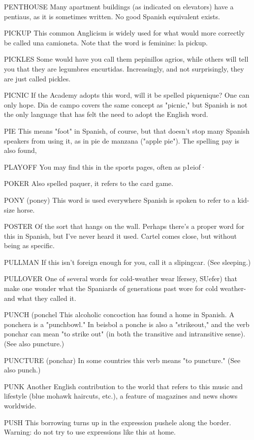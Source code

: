 PENTHOUSE Many apartment buildings (as indicated on elevators) have a pentiaus, as it is sometimes written. No good Spanish
equivalent exists.

PICKUP This common Anglicism is widely used for what
would more correctly be called una camioneta. Note that the word is
feminine: la pickup.

PICKLES Some would have you call them pepinillos agrios,
while others will tell you that they are legumbres encurtidas. Increasingly, and not surprisingly, they are just called pickles.

PICNIC If the Academy adopts this word, will it be spelled piquenique? One can only hope. Dia de campo covers the same concept
as "picnic," but Spanish is not the only language that has felt the need
to adopt the English word.

PIE This means "foot" in Spanish, of course, but that doesn't
stop many Spanish speakers from using it, as in pie de manzana
("apple pie"). The spelling pay is also found,

PLAYOFF You may find this in the sports pages, often as
p1eiof·

POKER Also spelled paquer, it refers to the card game.

PONY (poney) This word is used everywhere Spanish is spoken to refer to a kid-size horse.

POSTER Of the sort that hangs on the wall. Perhaps there's a
proper word for this in Spanish, but I've never heard it used. Cartel
comes close, but without being as specific.

PULLMAN If this isn't foreign enough for you, call it a slipingcar. (See sleeping.)

PULLOVER One of several words for cold-weather wear lfersey, SUefer) that make one wonder what the Spaniards of generations
past wore for cold weather-and what they called it.

PUNCH (ponchel This alcoholic concoction has found a home
in Spanish. A ponchera is a "punchbowl." In beisbol a ponche is also
a "strikeout," and the verb ponchar can mean "to strike out" (in both
the transitive and intransitive sense). (See also puncture.)

PUNCTURE (ponchar) In some countries this verb means "to
puncture." (See also punch.)

PUNK Another English contribution to the world that refers
to this music and lifestyle (blue mohawk haircuts, etc.), a feature of
magazines and news shows worldwide.

PUSH This borrowing turns up in the expression pushele
along the border. Warning: do not try to use expressions like this
at home.

